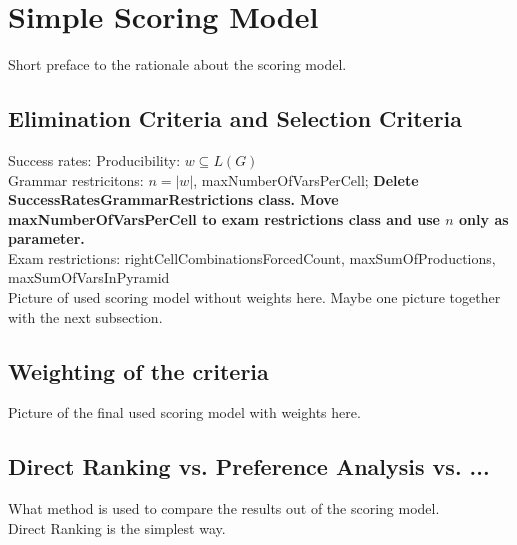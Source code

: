 
\section{Simple Scoring Model}

\noindent Short preface to the rationale about the scoring model. 

\subsection{Elimination Criteria and Selection Criteria}

\noindent Success rates: 
Producibility: $w \subseteq L(G)$\\
Grammar restricitons: $n=|w|$, maxNumberOfVarsPerCell; \textbf{Delete SuccessRatesGrammarRestrictions class. Move maxNumberOfVarsPerCell to exam restrictions class and use $n$ only as parameter.} \\
Exam restrictions: rightCellCombinationsForcedCount, maxSumOfProductions, maxSumOfVarsInPyramid\\

\noindent Picture of used scoring model without weights here. Maybe one picture together with the next subsection. 

\subsection{Weighting of the criteria}

\noindent Picture of the final used scoring model with weights here. 

\subsection{Direct Ranking vs. Preference Analysis vs. ...}

What method is used to compare the results out of the scoring model.\\
Direct Ranking is the simplest way.

\pagebreak